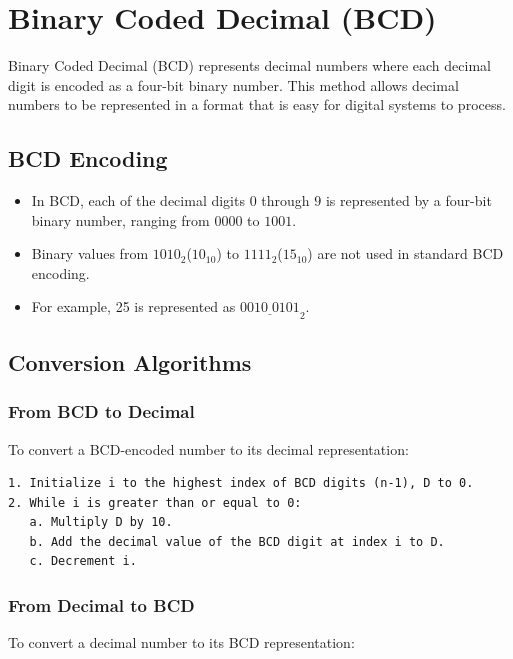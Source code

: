 \documentclass[12pt,openany, tikz,border=10pt]{book}
\begin{document}
\section{Binary Coded Decimal (BCD)}

Binary Coded Decimal (BCD) represents decimal numbers where each decimal digit is encoded as a four-bit binary number. This method allows decimal numbers to be represented in a format that is easy for digital systems to process.

\subsection{BCD Encoding}

\begin{itemize}
    \item In BCD, each of the decimal digits \(0\) through \(9\) is represented by a four-bit binary number, ranging from \(0000\) to \(1001\).
    \item Binary values from \(1010_2\)($10_{10}$) to \(1111_{2}\)($15_{10}$) are not used in standard BCD encoding.
    \item For example, 25 is represented as \(\underline{{0010 \; 0101}}_{2}\).
\end{itemize}

\subsection{Conversion Algorithms}

\subsubsection{From BCD to Decimal}

To convert a BCD-encoded number to its decimal representation:

\begin{verbatim}
1. Initialize i to the highest index of BCD digits (n-1), D to 0.
2. While i is greater than or equal to 0:
   a. Multiply D by 10.
   b. Add the decimal value of the BCD digit at index i to D.
   c. Decrement i.
\end{verbatim}

\subsubsection{From Decimal to BCD}

To convert a decimal number to its BCD representation:
\end{document}
